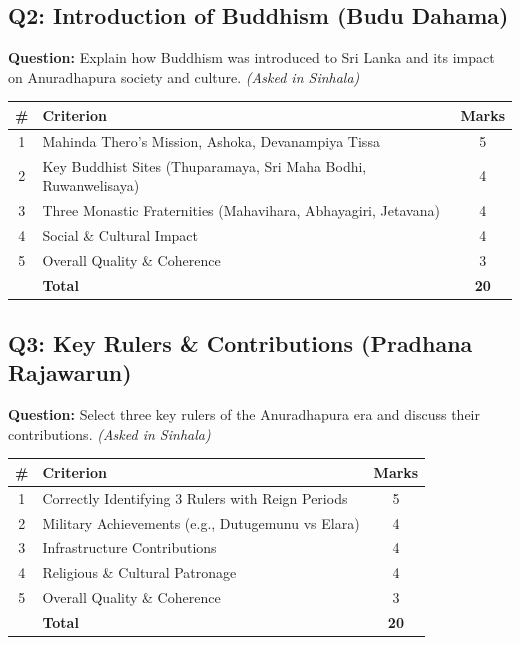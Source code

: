 \documentclass[12pt,a4paper]{article}
\begin{document}
\subsection{Q2: Introduction of Buddhism (Budu Dahama)}
\textbf{Question:} Explain how Buddhism was introduced to Sri Lanka and its impact on Anuradhapura society and culture. \textit{(Asked in Sinhala)}

\begin{table}[H]
\centering
\begin{tabular}{clc}
\toprule
\# & Criterion & Marks \\
\midrule
1 & Mahinda Thero's Mission, Ashoka, Devanampiya Tissa & 5 \\
2 & Key Buddhist Sites (Thuparamaya, Sri Maha Bodhi, Ruwanwelisaya) & 4 \\
3 & Three Monastic Fraternities (Mahavihara, Abhayagiri, Jetavana) & 4 \\
4 & Social \& Cultural Impact & 4 \\
5 & Overall Quality \& Coherence & 3 \\
\midrule
  & \textbf{Total} & \textbf{20} \\
\bottomrule
\end{tabular}
\end{table}

\subsection{Q3: Key Rulers \& Contributions (Pradhana Rajawarun)}
\textbf{Question:} Select three key rulers of the Anuradhapura era and discuss their contributions. \textit{(Asked in Sinhala)}

\begin{table}[H]
\centering
\begin{tabular}{clc}
\toprule
\# & Criterion & Marks \\
\midrule
1 & Correctly Identifying 3 Rulers with Reign Periods & 5 \\
2 & Military Achievements (e.g., Dutugemunu vs Elara) & 4 \\
3 & Infrastructure Contributions & 4 \\
4 & Religious \& Cultural Patronage & 4 \\
5 & Overall Quality \& Coherence & 3 \\
\midrule
  & \textbf{Total} & \textbf{20} \\
\bottomrule
\end{tabular}
\end{table}
\end{document}
